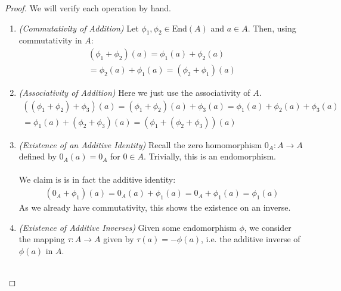 \documentclass[12pt]{article}
\newenvironment{ex}[2][Exercise]{\begin{trivlist}
\item[\hskip \labelsep {\bfseries #1}\hskip \labelsep {\bfseries #2.}]}{\end{trivlist}}
\begin{document}
\begin{ex}{3}
\begin{enumerate}[label=(\alph*)]
        \begin{proof}
        We will verify each operation by hand. 
        \begin{enumerate}
            \item \textit{(Commutativity of Addition)} Let $\phi_1, \phi_2 \in \text{End}(A)$ and $a \in A$. Then, using commutativity in $A$:
            \begin{equation}
                \begin{aligned}
                    (\phi_1 + \phi_2)(a) = \phi_1(a) + \phi_2(a) \\
                    = \phi_2(a) + \phi_1(a) = (\phi_2 + \phi_1)(a)
                \end{aligned}
            \end{equation}
            \item \textit{(Associativity of Addition)} Here we just use the associativity of $A$.
            \begin{equation}
                \begin{aligned}
                    ((\phi_1 + \phi_2) + \phi_3)(a) = (\phi_1 + \phi_2)(a) + \phi_3(a) = \phi_1(a) + \phi_2(a) + \phi_3(a) \\
                    = \phi_1(a) + (\phi_2 + \phi_3)(a)  = (\phi_1 + (\phi_2 + \phi_3))(a)
                \end{aligned}
            \end{equation}
            \item \textit{(Existence of an Additive Identity)} Recall the zero homomorphism $0_A: A \rightarrow A$ defined by $0_A(a) = 0_A$ for $0 \in A$. Trivially, this is an endomorphism. \\ \\
            We claim is is in fact the additive identity:
            \begin{equation}
                \begin{aligned}
                    (0_A + \phi_1)(a) = 0_A(a) + \phi_1(a) = 0_A + \phi_1(a) = \phi_1(a)
                \end{aligned}
            \end{equation}
            As we already have commutativity, this shows the existence on an inverse. 
            \item \textit{(Existence of Additive Inverses)} Given some endomorphism $\phi$, we consider the mapping $\tau : A \rightarrow A$ given by $\tau(a) = -\phi(a)$, i.e. the additive inverse of $\phi(a)$ in $A$. \\ \\

\end{enumerate}
\end{proof}
\end{enumerate}
\end{ex}
\end{document}
